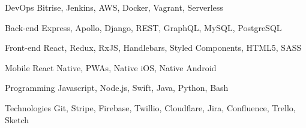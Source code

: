 

\begin{cvskills}

  \cvskill
    {DevOps} %
    {Bitrise, Jenkins, AWS, Docker, Vagrant, Serverless} %

  \cvskill
    {Back-end} %
    {Express, Apollo, Django, REST, GraphQL, MySQL, PostgreSQL} %

  \cvskill
    {Front-end} %
    {React, Redux, RxJS, Handlebars, Styled Components, HTML5, SASS} %


  \cvskill
  {Mobile} %
  {React Native, PWAs, Native iOS, Native Android} %

  \cvskill
    {Programming} %
    {Javascript, Node.js, Swift, Java, Python, Bash} %


  \cvskill
  {Technologies} %
  {Git, Stripe, Firebase, Twillio, Cloudflare, Jira, Confluence, Trello, Sketch} %



\end{cvskills}
